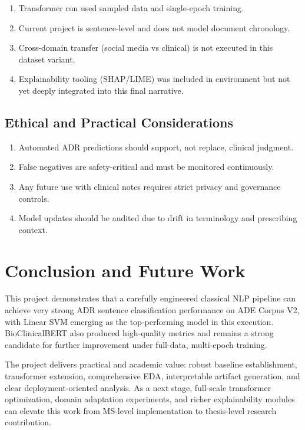 \documentclass[11pt]{article}
\begin{document}
\begin{enumerate}
  \item Transformer run used sampled data and single-epoch training.
  \item Current project is sentence-level and does not model document chronology.
  \item Cross-domain transfer (social media vs clinical) is not executed in this dataset variant.
  \item Explainability tooling (SHAP/LIME) was included in environment but not yet deeply integrated into this final narrative.
\end{enumerate}

\subsection{Ethical and Practical Considerations}

\begin{enumerate}
  \item Automated ADR predictions should support, not replace, clinical judgment.
  \item False negatives are safety-critical and must be monitored continuously.
  \item Any future use with clinical notes requires strict privacy and governance controls.
  \item Model updates should be audited due to drift in terminology and prescribing context.
\end{enumerate}

\section{Conclusion and Future Work}

This project demonstrates that a carefully engineered classical NLP pipeline can achieve very strong ADR sentence classification performance on ADE Corpus V2, with Linear SVM emerging as the top-performing model in this execution. BioClinicalBERT also produced high-quality metrics and remains a strong candidate for further improvement under full-data, multi-epoch training.


The project delivers practical and academic value: robust baseline establishment, transformer extension, comprehensive EDA, interpretable artifact generation, and clear deployment-oriented analysis. As a next stage, full-scale transformer optimization, domain adaptation experiments, and richer explainability modules can elevate this work from MS-level implementation to thesis-level research contribution.
\end{document}
